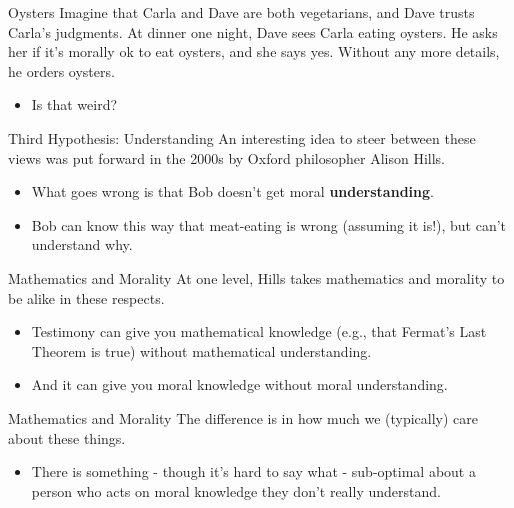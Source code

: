 \documentclass[
  17pt,
  letterpaper,
  ignorenonframetext,
  aspectratio=169,
]{beamer}
\providecommand{\tightlist}{%
  \setlength{\itemsep}{0pt}\setlength{\parskip}{0pt}}\usepackage{longtable,booktabs,array}
\begin{document}
\begin{frame}{Oysters}
\protect\hypertarget{oysters}{}
Imagine that Carla and Dave are both vegetarians, and Dave trusts
Carla's judgments. At dinner one night, Dave sees Carla eating oysters.
He asks her if it's morally ok to eat oysters, and she says yes. Without
any more details, he orders oysters.

\begin{itemize}[<+->]
\tightlist
\item
  Is that weird?
\end{itemize}
\end{frame}

\begin{frame}{Third Hypothesis: Understanding}
\protect\hypertarget{third-hypothesis-understanding}{}
An interesting idea to steer between these views was put forward in the
2000s by Oxford philosopher Alison Hills.

\begin{itemize}[<+->]
\tightlist
\item
  What goes wrong is that Bob doesn't get moral \textbf{understanding}.
\item
  Bob can know this way that meat-eating is wrong (assuming it is!), but
  can't understand why.
\end{itemize}
\end{frame}

\begin{frame}{Mathematics and Morality}
\protect\hypertarget{mathematics-and-morality-1}{}
At one level, Hills takes mathematics and morality to be alike in these
respects.

\begin{itemize}[<+->]
\tightlist
\item
  Testimony can give you mathematical knowledge (e.g., that Fermat's
  Last Theorem is true) without mathematical understanding.
\item
  And it can give you moral knowledge without moral understanding.
\end{itemize}
\end{frame}

\begin{frame}{Mathematics and Morality}
\protect\hypertarget{mathematics-and-morality-2}{}
The difference is in how much we (typically) care about these things.

\begin{itemize}[<+->]
\tightlist
\item
  There is something - though it's hard to say what - sub-optimal about
  a person who acts on moral knowledge they don't really understand.
\end{itemize}
\end{frame}
\end{document}
